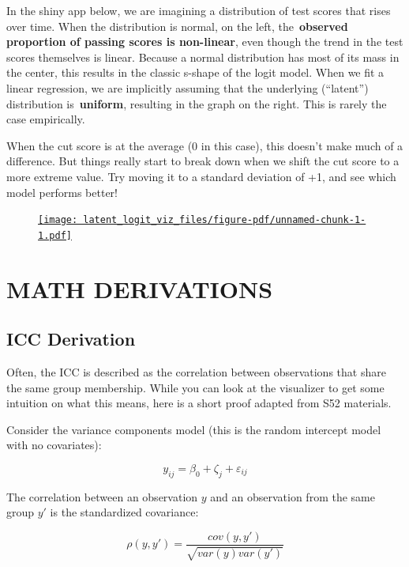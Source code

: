 \documentclass[
  letterpaper,
  DIV=11,
  numbers=noendperiod]{scrreprt}
\begin{document}
In the shiny app below, we are imagining a distribution of test scores
that rises over time. When the distribution is normal, on the left,
the~\textbf{observed proportion of passing scores is non-linear}, even
though the trend in the test scores themselves is linear. Because a
normal distribution has most of its mass in the center, this results in
the classic s-shape of the logit model. When we fit a linear regression,
we are implicitly assuming that the underlying (``latent'') distribution
is~\textbf{uniform}, resulting in the graph on the right. This is rarely
the case empirically.

When the cut score is at the average (0 in this case), this doesn't make
much of a difference. But things really start to break down when we
shift the cut score to a more extreme value. Try moving it to a standard
deviation of +1, and see which model performs better!

\begin{figure}

{\centering 

\href{https://s43dnt-josh-gilbert.shinyapps.io/s43_latent_logit_viz/}{\texttt{[image: latent\_logit\_viz\_files/figure-pdf/unnamed-chunk-1-1.pdf]}}

}

\end{figure}

\part{MATH DERIVATIONS}

\hypertarget{icc-derivation}{%
\chapter{ICC Derivation}\label{icc-derivation}}

Often, the ICC is described as the correlation between observations that
share the same group membership. While you can look at the visualizer to
get some intuition on what this means, here is a short proof adapted
from S52 materials.

Consider the variance components model (this is the random intercept
model with no covariates):

\[
y_{ij} = \beta_0 + \zeta_j + \varepsilon_{ij}
\]

The correlation between an observation \(y\) and an observation from the
same group \(y'\) is the standardized covariance:

\[
\rho(y, y') = \frac{cov(y,y')}{\sqrt{var(y)var(y')}}
\]
\end{document}
